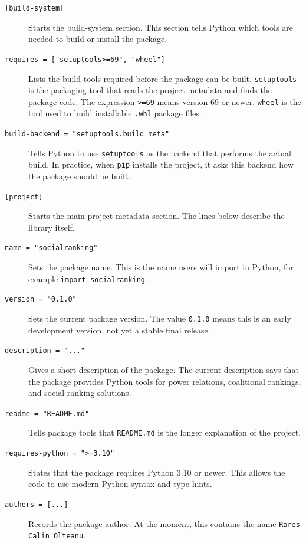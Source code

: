 \documentclass[11pt]{article}
\begin{document}
\begin{description}
  \item[\texttt{[build-system]}]
  Starts the build-system section. This section tells Python which tools are
  needed to build or install the package.

  \item[\texttt{requires = ["setuptools>=69", "wheel"]}]
  Lists the build tools required before the package can be built.
  \texttt{setuptools} is the packaging tool that reads the project metadata and
  finds the package code. The expression \texttt{>=69} means version 69 or
  newer. \texttt{wheel} is the tool used to build installable \texttt{.whl}
  package files.

  \item[\texttt{build-backend = "setuptools.build\_meta"}]
  Tells Python to use \texttt{setuptools} as the backend that performs the
  actual build. In practice, when \texttt{pip} installs the project, it asks
  this backend how the package should be built.

  \item[\texttt{[project]}]
  Starts the main project metadata section. The lines below describe the
  library itself.

  \item[\texttt{name = "socialranking"}]
  Sets the package name. This is the name users will import in Python, for
  example \texttt{import socialranking}.

  \item[\texttt{version = "0.1.0"}]
  Sets the current package version. The value \texttt{0.1.0} means this is an
  early development version, not yet a stable final release.

  \item[\texttt{description = "..."}]
  Gives a short description of the package. The current description says that
  the package provides Python tools for power relations, coalitional rankings,
  and social ranking solutions.

  \item[\texttt{readme = "README.md"}]
  Tells package tools that \texttt{README.md} is the longer explanation of the
  project.

  \item[\texttt{requires-python = ">=3.10"}]
  States that the package requires Python 3.10 or newer. This allows the code
  to use modern Python syntax and type hints.

  \item[\texttt{authors = [...]}]
  Records the package author. At the moment, this contains the name
  \texttt{Rares Calin Olteanu}.


\end{description}
\end{document}
